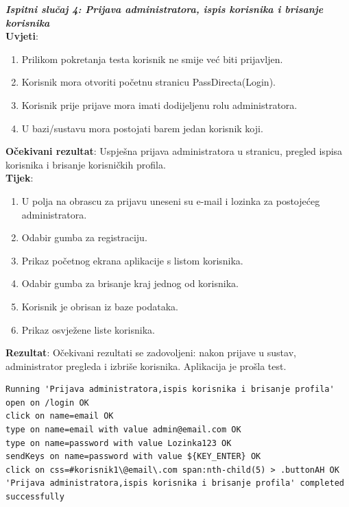 {{{\textbf{\textit{Ispitni slučaj 4: Prijava administratora, ispis korisnika i brisanje korisnika}}\\
\textbf{Uvjeti}:
			 \begin{enumerate}
				\item Prilikom pokretanja testa korisnik ne smije već biti prijavljen.
				\item Korisnik mora otvoriti početnu stranicu PassDirecta(Login).
				\item Korisnik prije prijave mora imati dodijeljenu rolu administratora.
				\item U bazi/sustavu mora postojati barem jedan korisnik koji.
			 \end{enumerate}
\textbf{Očekivani rezultat}: Uspješna prijava administratora u stranicu, pregled ispisa korisnika i brisanje korisničkih profila.\\
\textbf{Tijek}:
			 \begin{enumerate}
			 	\item U polja na obrascu za prijavu uneseni su e-mail i lozinka za postojećeg administratora.
			 	\item Odabir gumba za registraciju.
			 	\item Prikaz početnog ekrana aplikacije s listom korisnika.
				\item Odabir gumba za brisanje kraj jednog od korisnika.
				\item Korisnik je obrisan iz baze podataka.
				\item Prikaz osvježene liste korisnika.
			 \end{enumerate}
			 \noindent \textbf{Rezultat}:
			 Očekivani rezultati se zadovoljeni: nakon prijave u sustav, administrator pregleda i izbriše korisnika. Aplikacija je prošla test. \\



\begin{lstlisting}
Running 'Prijava administratora,ispis korisnika i brisanje profila'
open on /login OK
click on name=email OK
type on name=email with value admin@email.com OK
type on name=password with value Lozinka123 OK
sendKeys on name=password with value ${KEY_ENTER} OK
click on css=#korisnik1\@email\.com span:nth-child(5) > .buttonAH OK
'Prijava administratora,ispis korisnika i brisanje profila' completed 
successfully
\end{lstlisting}
 }}
	
 
 
	
			
			\eject 
		
}
